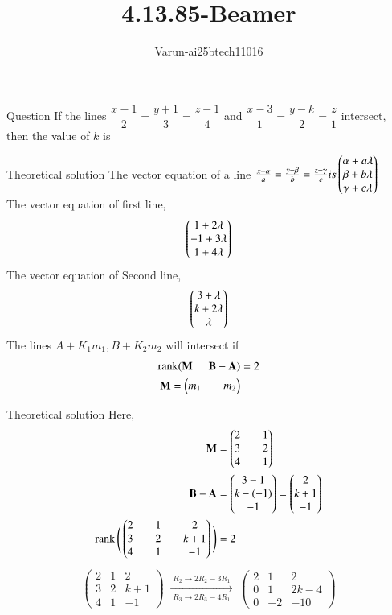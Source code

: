 \documentclass{beamer}
\title %
{4.13.85-Beamer}
\author %
{Varun-ai25btech11016}
\begin{document}
\frame{\titlepage}
\begin{frame}{Question}
If the lines $\dfrac{x-1}{2} = \dfrac{y+1}{3} = \dfrac{z-1}{4}$ 
and $\dfrac{x-3}{1} = \dfrac{y-k}{2} = \dfrac{z}{1}$ intersect, 
then the value of $k$ is

\end{frame}
\begin{frame}{Theoretical solution}
The vector equation of a line $\tfrac{x-\alpha}{a}=\tfrac{y-\beta}{b}=\tfrac{z-\gamma}{c}  is \begin{pmatrix}\alpha+a\lambda\\\beta+b\lambda\\\gamma+c\lambda\end{pmatrix}$\\
The vector equation of first line,
\begin{align}
\begin{pmatrix}1+2\lambda\\-1+3\lambda\\1+4\lambda\end{pmatrix}
\end{align}
The vector equation of Second line,
\begin{align}
\begin{pmatrix}3+\lambda\\k+2\lambda\\\lambda\end{pmatrix}
\end{align}
The lines $A+ K_1m_1,B+K_2m_2$ will intersect if 
\begin{align}
\operatorname{rank}(\mathbf{M} \hspace{5mm}  \mathbf{B-A})&=2\\
\mathbf{M}=\begin{pmatrix}m_1&&m_2\end{pmatrix}
\end{align}
\end{frame}
\begin{frame}{Theoretical solution}
Here,
\begin{align}
\mathbf{M}&=\begin{pmatrix}2&&1\\3&&2\\4&&1\end{pmatrix}\\
\mathbf{B-A}&=\begin{pmatrix}3-1\\k-(-1)\\-1\end{pmatrix}=\begin{pmatrix}2\\k+1\\-1\end{pmatrix}\\
\operatorname{rank}\Bigg(\begin{pmatrix}2&&1&&2\\3&&2&&k+1\\4&&1&&-1\end{pmatrix}\Bigg)&=2
\end{align}
\begin{align}
\begin{pmatrix}
2 & 1 & 2\\
3 & 2 & k+1\\
4 & 1 & -1
\end{pmatrix}
\;\xrightarrow[\;R_3 \to 2R_3 - 4R_1\;]{\;R_2 \to 2R_2 - 3R_1\;}\;
\begin{pmatrix}
2 & 1 & 2\\
0 & 1 & 2k-4\\
0 & -2 & -10
\end{pmatrix}\\
\end{align}
\end{frame}
\end{document}
